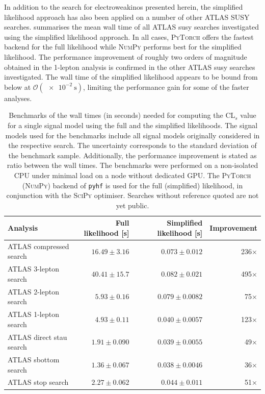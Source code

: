 In addition to the search for electroweakinos presented herein, the simplified likelihood approach has also been applied on a number of other ATLAS SUSY searches.  summarises the mean wall time of all ATLAS \gls{susy} searches investigated using the simplified likelihood approach. In all cases, \textsc{PyTorch} offers the fastest backend for the full likelihood while \textsc{NumPy} performs best for the simplified likelihood. The performance improvement of roughly two orders of magnitude obtained in the 1-lepton analysis is confirmed in the other ATLAS \gls{susy} searches investigated. The wall time of the simplified likelihood appears to be bound from below at $\mathcal{O}(\SI{e-2}{\second})$, limiting the performance gain for some of the faster analyses.

\begin{table}
	\begin{center}
	\small
			\begin{tabular} {l r r r}
				\toprule
				Analysis & Full likelihood [s] & Simplified likelihood [s] & Improvement \\
				\midrule
				ATLAS compressed search~\cite{SUSY-2018-16} & $16.49\pm 3.16$ & $0.073 \pm 0.012$ & 236$\times$ \\
				ATLAS 3-lepton search & $40.41 \pm 15.7$ & $0.082 \pm 0.021$ & 495$\times$\\
				ATLAS 2-lepton search~\cite{SUSY-2018-32} & $5.93 \pm 0.16$ & $0.079 \pm 0.0082$ & 75$\times$\\
				ATLAS 1-lepton search~\cite{SUSY-2019-08} & $4.93 \pm 0.11$ & $0.040 \pm 0.0057$ & 123$\times$ \\
				ATLAS direct stau search~\cite{SUSY-2018-04} & $1.91 \pm 0.090$ & $0.039 \pm 0.0055$ & 49$\times$\\
				ATLAS sbottom search~\cite{SUSY-2018-31} & $1.36 \pm 0.067$ & $0.038 \pm 0.0046$ & 36$\times$ \\
				ATLAS stop search & $2.27 \pm 0.062$ & $0.044 \pm 0.011$ & 51$\times$\\
				\bottomrule
			\end{tabular}
		\caption{Benchmarks of the wall times (in seconds) needed for computing the CL$_s$ value for a single signal model using the full and the simplified likelihoods. The signal models used for the benchmarks include all signal models originally considered in the respective search. The uncertainty corresponds to the standard deviation of the benchmark sample. Additionally, the performance improvement is stated as ratio between the wall times. The benchmarks were performed on a non-isolated CPU under minimal load on a node without dedicated GPU. The \textsc{PyTorch} (\textsc{NumPy}) backend of \texttt{pyhf} is used for the full (simplified) likelihood, in conjunction with the \textsc{SciPy} optimiser. Searches without reference quoted are not yet public.}
		\label{tab:simplified_performance}
	\end{center}
\end{table}

